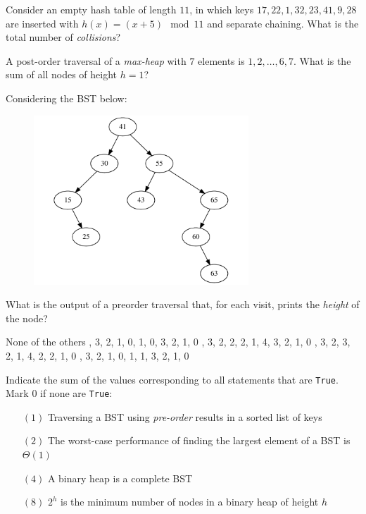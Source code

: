 \documentclass[12pt,addpoints]{exam}
\begin{document}
\begin{questions}

\question[5] 
Consider an empty hash table of length $11$, in which keys $17,22,1,32,23,41,9,28$ are inserted with $h(x)=(x+5) \mod 11$ and separate chaining.  What is the total number of {\it collisions}?
\answerline

\question[5] 
A post-order traversal of a {\it max-heap} with $7$ elements is $1,2,\dots,6,7$.  What is the sum of all nodes of height $h=1$?
\answerline

\question[5] Considering the BST below:
\begin{figure}[h!]
  \centering
  \includegraphics[height=2.5in]{imgs/bst.pdf}
\end{figure}

What is the output of a preorder traversal that, for each visit, prints the {\it height} of the node?
\begin{choices}	
	\choice None of the others	
	, 3, 2, 1, 0, 1, 0, 3, 2, 1, 0	
	, 3, 2, 2, 2, 1, 4, 3, 2, 1, 0	
	, 3, 2, 3, 2, 1, 4, 2, 2, 1, 0	
	, 3, 2, 1, 0, 1, 1, 3, 2, 1, 0
\end{choices}
\answerline

\question[5] 
Indicate the sum of the values corresponding to all statements that are \verb|True|.  Mark $0$ if none are \verb|True|:
\begin{itemize}
	\item[$(1)$] Traversing a BST using {\it pre-order} results in a sorted list of keys
	\item[$(2)$] The worst-case performance of finding the largest element of a BST is $\Theta(1)$
	\item[$(4)$] A binary heap is a complete BST
	\item[$(8)$] $2^h$ is the minimum number of nodes in a binary heap of height $h$\end{itemize}
\answerline

\end{questions}
\end{document}
